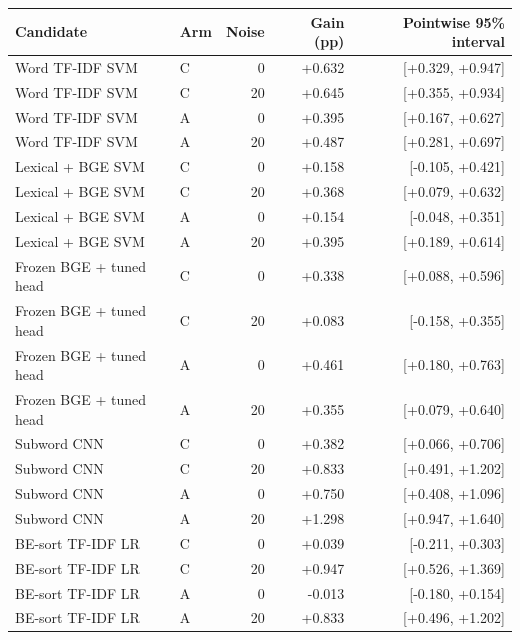 \begin{tabular}{llrrr}
\toprule
Candidate & Arm & Noise & Gain (pp) & Pointwise 95\% interval \\
\midrule
Word TF-IDF SVM & C & 0 & +0.632 & [+0.329, +0.947] \\
Word TF-IDF SVM & C & 20 & +0.645 & [+0.355, +0.934] \\
Word TF-IDF SVM & A & 0 & +0.395 & [+0.167, +0.627] \\
Word TF-IDF SVM & A & 20 & +0.487 & [+0.281, +0.697] \\
Lexical + BGE SVM & C & 0 & +0.158 & [-0.105, +0.421] \\
Lexical + BGE SVM & C & 20 & +0.368 & [+0.079, +0.632] \\
Lexical + BGE SVM & A & 0 & +0.154 & [-0.048, +0.351] \\
Lexical + BGE SVM & A & 20 & +0.395 & [+0.189, +0.614] \\
Frozen BGE + tuned head & C & 0 & +0.338 & [+0.088, +0.596] \\
Frozen BGE + tuned head & C & 20 & +0.083 & [-0.158, +0.355] \\
Frozen BGE + tuned head & A & 0 & +0.461 & [+0.180, +0.763] \\
Frozen BGE + tuned head & A & 20 & +0.355 & [+0.079, +0.640] \\
Subword CNN & C & 0 & +0.382 & [+0.066, +0.706] \\
Subword CNN & C & 20 & +0.833 & [+0.491, +1.202] \\
Subword CNN & A & 0 & +0.750 & [+0.408, +1.096] \\
Subword CNN & A & 20 & +1.298 & [+0.947, +1.640] \\
BE-sort TF-IDF LR & C & 0 & +0.039 & [-0.211, +0.303] \\
BE-sort TF-IDF LR & C & 20 & +0.947 & [+0.526, +1.369] \\
BE-sort TF-IDF LR & A & 0 & -0.013 & [-0.180, +0.154] \\
BE-sort TF-IDF LR & A & 20 & +0.833 & [+0.496, +1.202] \\
\bottomrule
\end{tabular}
